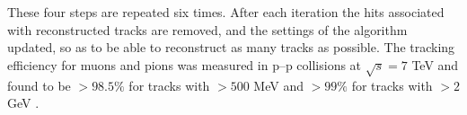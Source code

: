 These four steps are repeated six times. After each iteration
the hits associated with reconstructed tracks are removed, and the settings
of the algorithm updated, so as to be able to reconstruct as many
tracks as possible. The tracking efficiency for muons and pions was measured in p--p
collisions at $\sqrt{s} = 7$ TeV and found to be $ > 98.5\%$ for tracks
with \pT $ > 500 $ MeV and $ > 99 \%$ for tracks with \pT $ > 2 $ GeV \cite{cms-trk-7tev}.


